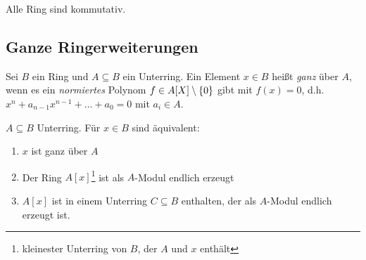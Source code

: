 \documentclass[../main.tex]{subfiles}
\begin{document}
Alle Ring sind kommutativ.
\subsection{Ganze Ringerweiterungen}
\begin{definition}
    Sei $B$ ein Ring und $A\subseteq B$ ein Unterring. Ein Element $x\in B$ heißt \emph{ganz} über $A$, wenn es ein \emph{normiertes} Polynom $f\in A[X]\setminus \{0\}$ gibt mit $f(x)=0$, d.h. $x^n + a_{n-1}x^{n-1} + \dots + a_0 = 0$ mit $a_i\in A$.
\end{definition}
\begin{theorem}
    $A\subseteq B$ Unterring. Für $x\in B$ sind äquivalent:
    \begin{enumerate}[label=(\roman*)]
        \item $x$ ist ganz über $A$
        \item Der Ring $A[x]$\footnote{kleinester Unterring von $B$, der $A$ und $x$ enthält} ist als $A$-Modul endlich erzeugt
        \item $A[x]$ ist in einem Unterring $C\subseteq B$ enthalten, der als $A$-Modul endlich erzeugt ist.
    \end{enumerate}
\end{theorem}
\end{document}
